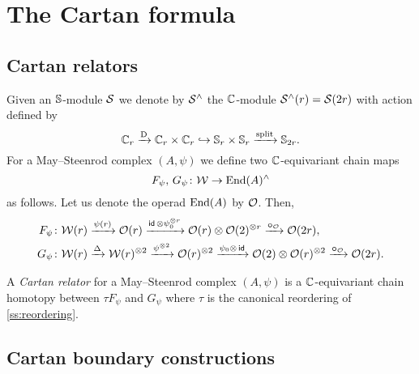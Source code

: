 
\section{The Cartan formula}\label{s:cartan}

\subsection{Cartan relators}

Given an $\mathbb{S}$-module $\mathcal{S}$ we denote by $\mathcal{S}^\wedge$ the $\mathbb{C}$-module $\mathcal{S}^\wedge(r) = \mathcal{S}(2r)$ with
action defined by
\begin{equation}\label{eq:cyclic to 2-symetric}
	\mathbb{C}_r \xrightarrow{\mathrm{D}}
	\mathbb{C}_r \times \mathbb{C}_r \hookrightarrow
	\mathbb{S}_r \times \mathbb{S}_r \xrightarrow{\mathrm{split}}
	\mathbb{S}_{2r}.
\end{equation}
For a May--Steenrod complex $(A,\psi)$ we define two $\mathbb{C}$-equivariant chain maps
\[
F_\psi,\, G_\psi \colon \mathcal{W} \to \mathrm{End}(A)^\wedge
\]
as follows.
Let us denote the operad $\mathrm{End}(A)$ by $\mathcal{O}$.
Then,
\begin{align*}
	F_\psi \colon& \mathcal{W}(r) \xrightarrow{\psi(r)} \mathcal{O}(r) \xrightarrow{\mathsf{id}\, \otimes \psi_0^{\otimes r}}
	\mathcal{O}(r) \otimes \mathcal{O}(2)^{\otimes r} \xrightarrow{\bm{\circ}_{\mathcal{O}}}
	\mathcal{O}(2r), \\
	G_\psi \colon& \mathcal{W}(r) \xrightarrow{\Delta}
	\mathcal{W}(r)^{\otimes 2} \xrightarrow{\psi^{\otimes 2}}
	\mathcal{O}(r)^{\otimes 2} \xrightarrow{\psi_0 \otimes\, \mathsf{id}}
	\mathcal{O}(2) \otimes \mathcal{O}(r)^{\otimes 2} \xrightarrow{\bm{\circ}_{\mathcal{O}}}
	\mathcal{O}(2r).
\end{align*}

\begin{definition*}
	A \textit{Cartan relator} for a May--Steenrod complex $(A, \psi)$ is a $\mathbb{C}$-equivariant chain homotopy between $\tau F_\psi$ and $G_\psi$ where $\tau$ is the canonical reordering of \cref{ss:reordering}.
\end{definition*}

\subsection{Cartan boundary constructions}\label{ss:cartan_coboundary}

